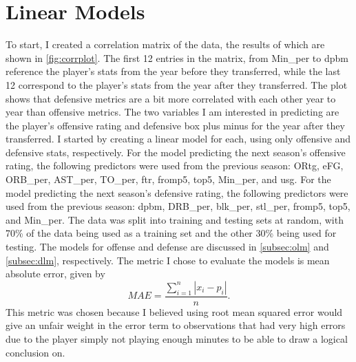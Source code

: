 \documentclass[12pt]{article}
\begin{document}
\section{Linear Models}
\label{sec:lms}
To start, I created a correlation matrix of the data, the results of which are shown in \autoref{fig:corrplot}. The first 12 entries in the matrix, from Min\_per to dpbm reference the player's stats from the year before they transferred, while the last 12 correspond to the player's stats from the year after they transferred. The plot shows that defensive metrics are a bit more correlated with each other year to year than offensive metrics. The two variables I am interested in predicting are the player's offensive rating and defensive box plus minus for the year after they transferred. I started by creating a linear model for each, using only offensive and defensive stats, respectively. For the model predicting the next season's offensive rating, the following predictors were used from the previous season: ORtg, eFG, ORB\_per, AST\_per, TO\_per, ftr, fromp5, top5, Min\_per, and usg. For the model predicting the next season's defensive rating, the following predictors were used from the previous season: dpbm, DRB\_per, blk\_per, stl\_per, fromp5, top5, and Min\_per. The data was split into training and testing sets at random, with 70\% of the data being used as a training set and the other 30\% being used for testing. The models for offense and defense are discussed in \ref{subsec:olm} and \ref{subsec:dlm}, respectively. The metric I chose to evaluate the models is mean absolute error, given by 
\begin{equation}
  MAE=\frac{\sum_{i=1}^{n}|x_{i}-p_{i}|}{n}.
\end{equation}
This metric was chosen because I believed using root mean squared error would give an unfair weight in the error term to observations that had very high errors due to the player simply not playing enough minutes to be able to draw a logical conclusion on.
\end{document}
